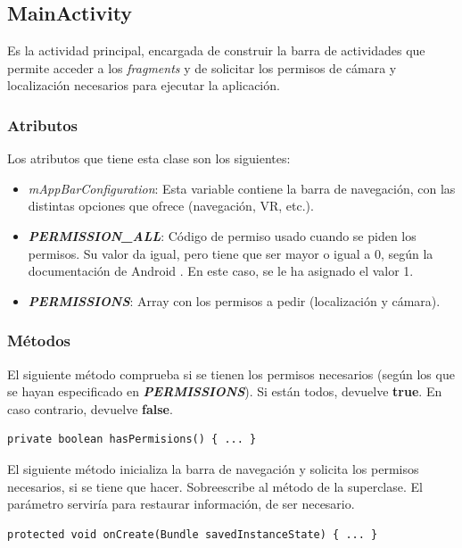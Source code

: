 \documentclass[11pt,a4paper]{article}
\begin{document}
\subsection{\textbf{MainActivity}}
\label{sec:main}

Es la actividad principal, encargada de construir la barra de actividades que permite acceder
a los \textit{fragments} y de solicitar los permisos de cámara y localización necesarios para ejecutar
la aplicación.

\subsubsection{Atributos}

Los atributos que tiene esta clase son los siguientes:

\begin{itemize}
    \item \textit{mAppBarConfiguration}: Esta variable contiene la barra de navegación, con las distintas opciones que ofrece (navegación,
    VR, etc.).
    \item \textit{\textbf{PERMISSION\_ALL}}: Código de permiso usado cuando se piden los permisos. Su valor da igual, pero tiene que ser mayor
    o igual a 0, según la documentación de Android \cite{bib:permisos}. En este caso, se le ha asignado el valor 1.
    \item \textit{\textbf{PERMISSIONS}}: Array con los permisos a pedir (localización y cámara).
\end{itemize}

\subsubsection{Métodos}

El siguiente método comprueba si se tienen los permisos necesarios (según los que se hayan especificado en \textit{\textbf{PERMISSIONS}}).
Si están todos, devuelve \textbf{true}. En caso contrario, devuelve \textbf{false}.

\begin{lstlisting}
private boolean hasPermisions() { ... }
\end{lstlisting}

El siguiente método inicializa la barra de navegación y solicita los permisos necesarios, si se tiene que hacer. Sobreescribe al método
de la superclase. El parámetro serviría para restaurar información, de ser necesario.

\begin{lstlisting}
protected void onCreate(Bundle savedInstanceState) { ... }
\end{lstlisting}
\end{document}
